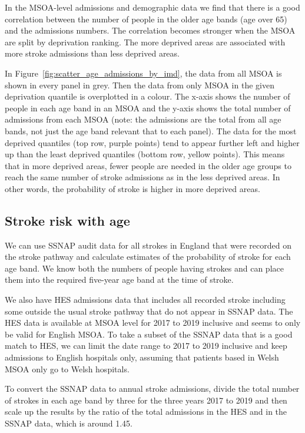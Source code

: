 \documentclass[12pt]{extarticle}
\begin{document}
In the MSOA-level admissions and demographic data we find that there is a good correlation between the number of people in the older age bands (age over 65) and the admissions numbers. The correlation becomes stronger when the MSOA are split by deprivation ranking. The more deprived areas are associated with more stroke admissions than less deprived areas.

In Figure~\ref{fig:scatter_age_admissions_by_imd}, the data from all MSOA is shown in every panel in grey. Then the data from only MSOA in the given deprivation quantile is overplotted in a colour. The x-axis shows the number of people in each age band in an MSOA and the y-axis shows the total number of admissions from each MSOA (note: the admissions are the total from all age bands, not just the age band relevant that to each panel).
The data for the most deprived quantiles (top row, purple points) tend to appear further left and higher up than the least deprived quantiles (bottom row, yellow points). This means that in more deprived areas, fewer people are needed in the older age groups to reach the same number of stroke admissions as in the less deprived areas. In other words, the probability of stroke is higher in more deprived areas.

\subsection{Stroke risk with age}

We can use SSNAP audit data for all strokes in England that were recorded on the stroke pathway and calculate estimates of the probability of stroke for each age band. We know both the numbers of people having strokes and can place them into the required five-year age band at the time of stroke.

We also have HES admissions data that includes all recorded stroke including some outside the usual stroke pathway that do not appear in SSNAP data. The HES data is available at MSOA level for 2017 to 2019 inclusive and seems to only be valid for English MSOA.
To take a subset of the SSNAP data that is a good match to HES, we can limit the date range to 2017 to 2019 inclusive and keep admissions to English hospitals only, assuming that patients based in Welsh MSOA only go to Welsh hospitals.

To convert the SSNAP data to annual stroke admissions, divide the total number of strokes in each age band by three for the three years 2017 to 2019 and then scale up the results by the ratio of the total admissions in the HES and in the SSNAP data, which is around 1.45.
\end{document}
